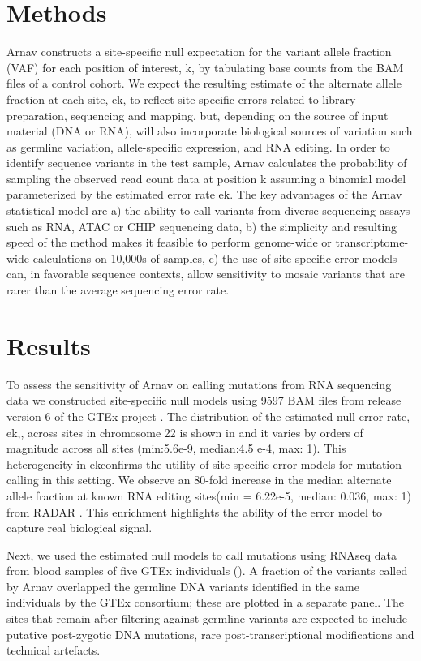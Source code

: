\section{Methods}

Arnav constructs a site-specific null expectation for the variant allele fraction (VAF) for each position of interest, k, by tabulating base counts from the BAM files of a control cohort. We expect the resulting estimate of the alternate allele fraction at each site, ek, to reflect site-specific errors related to library preparation, sequencing and mapping, but, depending on the source of input material (DNA or RNA), will also incorporate biological sources of variation such as germline variation, allele-specific expression, and RNA editing. In order to identify sequence variants in the test sample, Arnav calculates the probability of sampling the observed read count data at position k assuming a binomial model parameterized by the estimated error rate ek. The key advantages of the Arnav statistical model are a) the ability to call variants from diverse sequencing assays such as RNA, ATAC or CHIP sequencing data, b) the simplicity and resulting speed of the method makes it feasible to perform genome-wide or transcriptome-wide calculations on 10,000s of samples, c) the use of site-specific error models can, in favorable sequence contexts, allow sensitivity to mosaic variants that are rarer than the average sequencing error rate.


\section{Results}

To assess the sensitivity of Arnav on calling mutations from RNA sequencing data we constructed site-specific null models using 9597 BAM files from release version 6 of the GTEx project \cite{gtex_consortium_genetic_2017}. The distribution of the estimated null error rate, ek,, across sites in chromosome 22 is shown in  and it varies by orders of magnitude across all sites (min:5.6e-9, median:4.5 e-4, max: 1). This heterogeneity in ekconfirms the utility of site-specific error models for mutation calling in this setting. We observe an 80-fold increase in the median alternate allele fraction at known RNA editing sites(min = 6.22e-5, median: 0.036, max: 1) from RADAR \cite{ramaswami2014nar}. This enrichment highlights the ability of the error model to capture real biological signal.

Next, we used the estimated null models to call mutations using RNAseq data from blood samples of five GTEx individuals (). A fraction of the variants called by Arnav overlapped the germline DNA variants identified in the same individuals by the GTEx consortium; these are plotted in a separate panel. The sites that remain after filtering against germline variants are expected to include putative post-zygotic DNA mutations, rare post-transcriptional modifications and technical artefacts.

